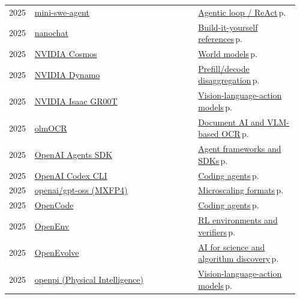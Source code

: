 \documentclass[10pt,a4paper,openany]{report}
\begin{document}
{\begin{longtable}{@{}p{0.07\linewidth}>{\raggedright}p{0.55\linewidth}>{\raggedright\arraybackslash}p{0.34\linewidth}@{}}
2025 & \href{https://github.com/SWE-agent/mini-swe-agent}{mini-swe-agent} & \hyperref[c:agents-3]{Agentic loop / ReAct}\,{\color{muted}\scriptsize p.\,\pageref{c:agents-3}}\\
2025 & \href{https://github.com/karpathy/nanochat}{nanochat} & \hyperref[c:training-9]{Build-it-yourself references}\,{\color{muted}\scriptsize p.\,\pageref{c:training-9}}\\
2025 & \href{https://github.com/nvidia-cosmos}{NVIDIA Cosmos} & \hyperref[c:embodied-2]{World models}\,{\color{muted}\scriptsize p.\,\pageref{c:embodied-2}}\\
2025 & \href{https://github.com/ai-dynamo/dynamo}{NVIDIA Dynamo} & \hyperref[c:inference-3]{Prefill/decode disaggregation}\,{\color{muted}\scriptsize p.\,\pageref{c:inference-3}}\\
2025 & \href{https://github.com/NVIDIA/Isaac-GR00T}{NVIDIA Isaac GR00T} & \hyperref[c:embodied-0]{Vision-language-action models}\,{\color{muted}\scriptsize p.\,\pageref{c:embodied-0}}\\
2025 & \href{https://github.com/allenai/olmocr}{olmOCR} & \hyperref[c:vlm-4]{Document AI and VLM-based OCR}\,{\color{muted}\scriptsize p.\,\pageref{c:vlm-4}}\\
2025 & \href{https://github.com/openai/openai-agents-python}{OpenAI Agents SDK} & \hyperref[c:agents-12]{Agent frameworks and SDKs}\,{\color{muted}\scriptsize p.\,\pageref{c:agents-12}}\\
2025 & \href{https://github.com/openai/codex}{OpenAI Codex CLI} & \hyperref[c:coding-0]{Coding agents}\,{\color{muted}\scriptsize p.\,\pageref{c:coding-0}}\\
2025 & \href{https://github.com/openai/gpt-oss}{openai/gpt-oss (MXFP4)} & \hyperref[c:quant-0]{Microscaling formats}\,{\color{muted}\scriptsize p.\,\pageref{c:quant-0}}\\
2025 & \href{https://github.com/sst/opencode}{OpenCode} & \hyperref[c:coding-0]{Coding agents}\,{\color{muted}\scriptsize p.\,\pageref{c:coding-0}}\\
2025 & \href{https://github.com/meta-pytorch/OpenEnv}{OpenEnv} & \hyperref[c:reasoning-5]{RL environments and verifiers}\,{\color{muted}\scriptsize p.\,\pageref{c:reasoning-5}}\\
2025 & \href{https://github.com/codelion/openevolve}{OpenEvolve} & \hyperref[c:embodied-7]{AI for science and algorithm discovery}\,{\color{muted}\scriptsize p.\,\pageref{c:embodied-7}}\\
2025 & \href{https://github.com/Physical-Intelligence/openpi}{openpi (Physical Intelligence)} & \hyperref[c:embodied-0]{Vision-language-action models}\,{\color{muted}\scriptsize p.\,\pageref{c:embodied-0}}\\

\end{longtable}}
\end{document}
